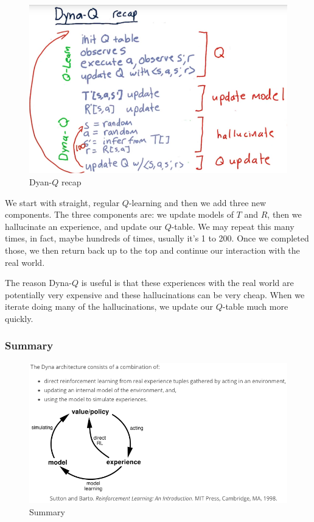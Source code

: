 \documentclass[12pt]{article}
\begin{document}
\begin{figure}[!ht]
\centering
\includegraphics[scale=0.45]{fig/fig117}
\caption{Dyan-$Q$ recap}
\end{figure}

We start with straight, regular $Q$-learning and then we add three new components. The three components are: we update models of $T$ and $R$, then we hallucinate an experience, and update our $Q$-table. We may repeat this many times, in fact, maybe hundreds of times, usually it's 1 to 200. Once we completed those, we then return back up to the top and continue our interaction with the real world. 

The reason Dyna-$Q$ is useful is that these experiences with the real world are potentially very expensive and these hallucinations can be very cheap. When we iterate doing many of the hallucinations, we update our $Q$-table much more quickly. 

\subsubsection{Summary}

\begin{figure}[!ht]
\centering
\includegraphics[scale=0.62]{fig/fig118}
\caption{Summary}
\end{figure}
\end{document}
